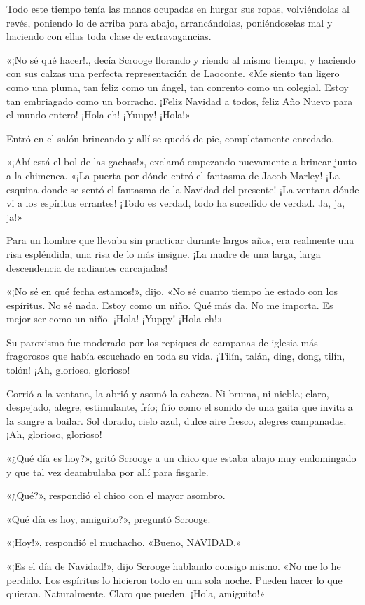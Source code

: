 \documentclass{novela}
\begin{document}
 Todo este tiempo tenía las manos ocupadas en hurgar sus ropas, volviéndolas al revés, poniendo lo de arriba para abajo, arrancándolas, poniéndoselas mal y haciendo con ellas toda clase de extravagancias.

 «¡No sé qué hacer!., decía Scrooge llorando y riendo al mismo tiempo, y haciendo con sus calzas una perfecta representación de Laoconte. «Me siento tan ligero como una pluma, tan feliz como un ángel, tan conrento como un colegial. Estoy tan embriagado como un borracho. ¡Feliz Navidad a todos, feliz Año Nuevo para el mundo entero! ¡Hola eh! ¡Yuupy! ¡Hola!»

 Entró en el salón brincando y allí se quedó de pie, completamente enredado.

 «¡Ahí está el bol de las gachas!», exclamó empezando nuevamente a brincar junto a la chimenea. «¡La puerta por dónde entró el fantasma de Jacob Marley! ¡La esquina donde se sentó el fantasma de la Navidad del presente! ¡La ventana dónde vi a los espíritus errantes! ¡Todo es verdad, todo ha sucedido de verdad. Ja, ja, ja!»

 Para un hombre que llevaba sin practicar durante largos años, era realmente una risa espléndida, una risa de lo más insigne. ¡La madre de una larga, larga descendencia de radiantes carcajadas!

 «¡No sé en qué fecha estamos!», dijo. «No sé cuanto tiempo he estado con los espíritus. No sé nada. Estoy como un niño. Qué más da. No me importa. Es mejor ser como un niño. ¡Hola! ¡Yuppy! ¡Hola eh!»

 Su paroxismo fue moderado por los repiques de campanas de iglesia más fragorosos que había escuchado en toda su vida. ¡Tilín, talán, ding, dong, tilín, tolón! ¡Ah, glorioso, glorioso!

 Corrió a la ventana, la abrió y asomó la cabeza. Ni bruma, ni niebla; claro, despejado, alegre, estimulante, frío; frío como el sonido de una gaita que invita a la sangre a bailar. Sol dorado, cielo azul, dulce aire fresco, alegres campanadas. ¡Ah, glorioso, glorioso!

 «¿Qué día es hoy?», gritó Scrooge a un chico que estaba abajo muy endomingado y que tal vez deambulaba por allí para fisgarle.

 «¿Qué?», respondió el chico con el mayor asombro.

 «Qué día es hoy, amiguito?», preguntó Scrooge.

 «¡Hoy!», respondió el muchacho. «Bueno, NAVIDAD.»

 «¡Es el día de Navidad!», dijo Scrooge hablando consigo mismo. «No me lo he perdido. Los espíritus lo hicieron todo en una sola noche. Pueden hacer lo que quieran. Naturalmente. Claro que pueden. ¡Hola, amiguito!»
\end{document}

